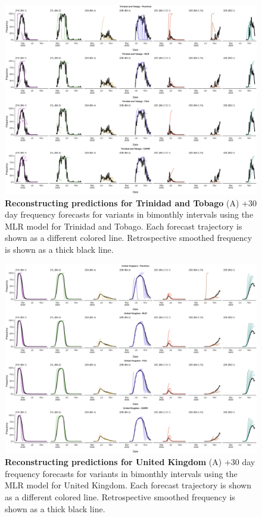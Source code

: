\documentclass[11pt,oneside,letterpaper]{article}
\begin{document}
\begin{figure}[tb!]
	\centering
	\includegraphics[width=0.9\textwidth=0.01]{supp_figures/supplementary_fig_Trinidad and Tobago.png}
	\caption{
		\textbf{Reconstructing predictions for Trinidad and Tobago}
		(A) +30 day frequency forecasts for variants in bimonthly intervals using the MLR model for Trinidad and Tobago.
		Each forecast trajectory is shown as a different colored line.
		Retrospective smoothed frequency is shown as a thick black line.
	}
	\label{fig:supplementary_fig_Trinidad and Tobago}
\end{figure}

\begin{figure}[tb!]
	\centering
	\includegraphics[width=0.9\textwidth=0.01]{supp_figures/supplementary_fig_United Kingdom.png}
	\caption{
		\textbf{Reconstructing predictions for United Kingdom}
		(A) +30 day frequency forecasts for variants in bimonthly intervals using the MLR model for United Kingdom.
		Each forecast trajectory is shown as a different colored line.
		Retrospective smoothed frequency is shown as a thick black line.
	}
	\label{fig:supplementary_fig_United Kingdom}
\end{figure}
\end{document}
